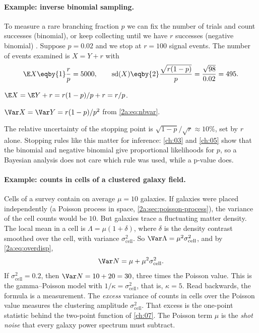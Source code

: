 \paragraph{Example: inverse binomial sampling.}
To measure a rare branching fraction $p$ we can fix the number of trials and count successes (binomial), or keep collecting until we have $r$ successes (negative binomial) . Suppose $p=0.02$ and we stop at $r=100$ signal events. The number of events examined is $X=Y+r$ with
\begin{align*}
  \E X \eqby{1} \frac{r}{p}=5000,\qquad \mathrm{sd}(X) \eqby{2} \frac{\sqrt{r(1-p)}}{p}=\frac{\sqrt{98}}{0.02}=495 .
\end{align*}
\begin{explain}
  \item $\E X=\E Y+r=r(1-p)/p+r=r/p$.
  \item $\Var X=\Var Y=r(1-p)/p^2$ from \eqref{2a:eq:nbvar}.
\end{explain}
The relative uncertainty of the stopping point is $\sqrt{1-p}/\sqrt r\approx10\%$, set by $r$ alone. Stopping rules like this matter for inference: \cref{ch:03} and \cref{ch:05} show that the binomial and negative binomial give proportional likelihoods for $p$, so a Bayesian analysis does not care which rule was used, while a p-value does.

\paragraph{Example: counts in cells of a clustered galaxy field.}
Cells of a survey contain on average $\mu=10$ galaxies. If galaxies were placed independently (a Poisson process in space, \cref{2a:sec:poisson-process}), the variance of the cell counts would be $10$. But galaxies trace a fluctuating matter density. The local mean in a cell is $\Lambda=\mu(1+\delta)$, where $\delta$ is the density contrast smoothed over the cell, with variance $\sigma^2_{\text{cell}}$. So $\Var\Lambda=\mu^2\sigma^2_{\text{cell}}$, and by \eqref{2a:eq:overdisp},
\[
  \Var N=\mu+\mu^2\sigma^2_{\text{cell}} .
\]
If $\sigma^2_{\text{cell}}=0.2$, then $\Var N=10+20=30$, three times the Poisson value. This is the gamma--Poisson model with $1/\kappa=\sigma^2_{\text{cell}}$, that is, $\kappa=5$. Read backwards, the formula is a measurement. The \emph{excess} variance of counts in cells over the Poisson value measures the clustering amplitude $\sigma^2_{\text{cell}}$. That excess is the one-point statistic behind the two-point function of \cref{ch:07}. The Poisson term $\mu$ is the \emph{shot noise} that every galaxy power spectrum must subtract.

